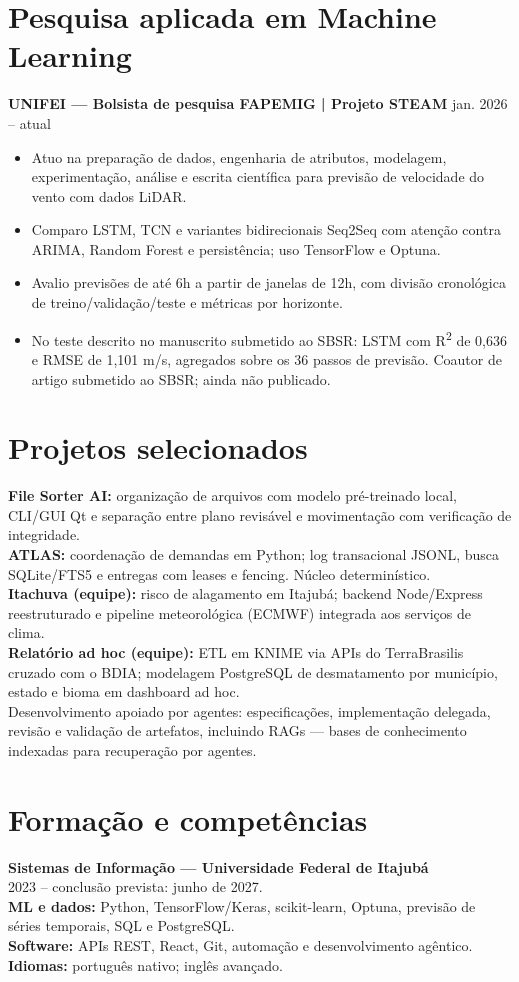 \documentclass[11pt,a4paper]{article}
\begin{document}
\section{Pesquisa aplicada em Machine Learning}
\textbf{UNIFEI — Bolsista de pesquisa FAPEMIG | Projeto STEAM} \hfill jan. 2026 -- atual
\begin{itemize}
\item Atuo na preparação de dados, engenharia de atributos, modelagem, experimentação, análise e escrita científica para previsão de velocidade do vento com dados LiDAR.
\item Comparo LSTM, TCN e variantes bidirecionais Seq2Seq com atenção contra ARIMA, Random Forest e persistência; uso TensorFlow e Optuna.
\item Avalio previsões de até 6h a partir de janelas de 12h, com divisão cronológica de treino/validação/teste e métricas por horizonte.
\item No teste descrito no manuscrito submetido ao SBSR: LSTM com R\textsuperscript{2} de 0,636 e RMSE de 1,101 m/s, agregados sobre os 36 passos de previsão. Coautor de artigo submetido ao SBSR; ainda não publicado.
\end{itemize}

\section{Projetos selecionados}
\textbf{File Sorter AI:} organização de arquivos com modelo pré-treinado local, CLI/GUI Qt e separação entre plano revisável e movimentação com verificação de integridade.\\
\textbf{ATLAS:} coordenação de demandas em Python; log transacional JSONL, busca SQLite/FTS5 e entregas com leases e fencing. Núcleo determinístico.\\
\textbf{Itachuva (equipe):} risco de alagamento em Itajubá; backend Node/Express reestruturado e pipeline meteorológica (ECMWF) integrada aos serviços de clima.\\
\textbf{Relatório ad hoc (equipe):} ETL em KNIME via APIs do TerraBrasilis cruzado com o BDIA; modelagem PostgreSQL de desmatamento por município, estado e bioma em dashboard ad hoc.\\
Desenvolvimento apoiado por agentes: especificações, implementação delegada, revisão e validação de artefatos, incluindo RAGs — bases de conhecimento indexadas para recuperação por agentes.

\section{Formação e competências}
\textbf{Sistemas de Informação — Universidade Federal de Itajubá}\\
2023 -- conclusão prevista: junho de 2027.\\
\textbf{ML e dados:} Python, TensorFlow/Keras, scikit-learn, Optuna, previsão de séries temporais, SQL e PostgreSQL.\\
\textbf{Software:} APIs REST, React, Git, automação e desenvolvimento agêntico.\\
\textbf{Idiomas:} português nativo; inglês avançado.
\end{document}

